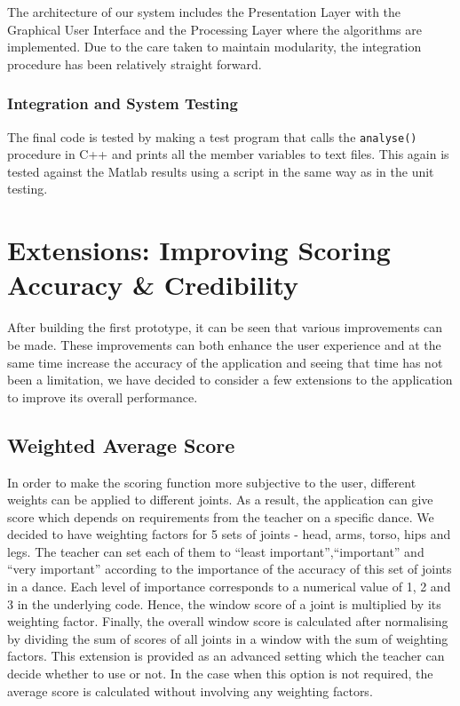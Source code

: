 \documentclass[11pt,a4paper]{article}
\begin{document}
\noindent
The architecture of our system includes the Presentation Layer with the Graphical User Interface and the Processing Layer where the algorithms are implemented. Due to the care taken to maintain modularity, the integration procedure has been relatively straight forward. 

\subsubsection{Integration and System Testing}
The final code is tested by making a test program that calls the \texttt{analyse()} procedure in C++ and prints all the member variables to text files. This again is tested against the Matlab results using a script in the same way as in the unit testing.

\clearpage
\section{Extensions: Improving Scoring Accuracy \& Credibility}
\noindent
After building the first prototype, it can be seen that various improvements can be made. These improvements can both enhance the user experience and at the same time increase the accuracy of the application and seeing that time has not been a limitation, we have decided to consider a few extensions to the application to improve its overall performance.

\subsection{Weighted Average Score}
\noindent
In order to make the scoring function more subjective to the user, different weights can be applied to different joints. As a result, the application can give score which depends on requirements from the teacher on a specific dance. We decided to have weighting factors for 5 sets of joints - head, arms, torso, hips and legs. The teacher can set each of them to ``least important'',``important'' and ``very important'' according to the importance of the accuracy of this set of joints in a dance. Each level of importance corresponds to a numerical value of 1, 2 and 3 in the underlying code. Hence, the window score of a joint is  multiplied by its weighting factor. Finally, the overall window score is calculated after  normalising by dividing the sum of scores of all joints in a window with the sum of weighting factors. This extension is provided as an advanced setting which the teacher can decide whether to use or not. In the case when this option is not required, the average score is calculated without involving any weighting factors. 
\end{document}
